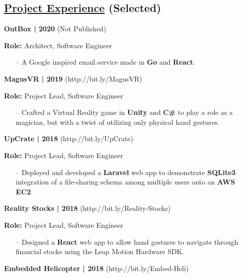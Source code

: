 \documentclass{article}
\begin{document}
\begin{multicols}{2}
\section*{\underline{Project Experience} {\small(Selected)}}
{\footnotesize{\textbf{OutBox | 2020} (Not Published)}}
{\footnotesize{
\newline\textbf{Role:} Architect, Software Engineer
\begin{itemize}
	\item[--] A Google inspired email service made in \textbf{Go} and \textbf{React}.
\end{itemize}
\hfill \break
}}
{\footnotesize{\textbf{MagusVR | 2019} (http://bit.ly/MagusVR)}}
{\footnotesize{
\newline\textbf{Role:} Project Lead, Software Engineer
\begin{itemize}
	\item[--] Crafted a Virtual Reality game in \textbf{Unity} and \textbf{C\#} to play a role as a magician, but with a twist of utilizing only physical hand gestures.
\end{itemize}
\hfill \break
}}
{\footnotesize{\textbf{UpCrate | 2018} (http://bit.ly/UpCrate)}}
{\footnotesize{
\newline\textbf{Role:} Project Lead, Software Engineer
\begin{itemize}
	\item[--] Deployed and developed a \textbf{Laravel} web app to demonstrate \textbf{SQLite3} integration of a file-sharing schema among multiple users onto an \textbf{AWS EC2}.
\end{itemize}
\hfill \break
}}
{\footnotesize{\textbf{Reality Stocks | 2018} (http://bit.ly/Reality-Stocks)}}
{\footnotesize{
\newline\textbf{Role:} Project Lead, Software Engineer
\begin{itemize}
	\item[--] Designed a \textbf{React} web app to allow hand gestures to navigate through financial stocks using the Leap Motion Hardware SDK.
\end{itemize}
}}
\hfill \break
{\footnotesize{\textbf{Embedded Helicopter | 2018} (http://bit.ly/Embed-Heli)}}

\end{multicols}
\end{document}
